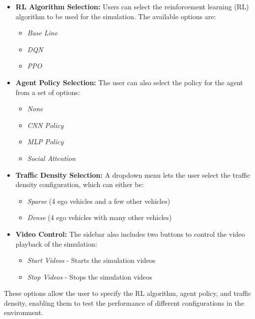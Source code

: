 \begin{itemize}
    \item \textbf{RL Algorithm Selection:} 
    Users can select the reinforcement learning (RL) algorithm to be used for the simulation. The available options are:
    \begin{itemize}
        \item \textit{Base Line}
        \item \textit{DQN}
        \item \textit{PPO}
    \end{itemize}

    \item \textbf{Agent Policy Selection:} 
    The user can also select the policy for the agent from a set of options:
    \begin{itemize}
        \item \textit{None} 
        \item \textit{CNN Policy}
        \item \textit{MLP Policy}
        \item \textit{Social Attention}
    \end{itemize}
    
    \item \textbf{Traffic Density Selection:} 
    A dropdown menu lets the user select the traffic density configuration, which can either be:
    \begin{itemize}
        \item \textit{Sparse} (4 ego vehicles and a few other vehicles)
        \item \textit{Dense} (4 ego vehicles with many other vehicles)
    \end{itemize}

    \item \textbf{Video Control:} 
    The sidebar also includes two buttons to control the video playback of the simulation:
    \begin{itemize}
        \item \textit{Start Videos} - Starts the simulation videos
        \item \textit{Stop Videos} - Stops the simulation videos
    \end{itemize}
\end{itemize}

These options allow the user to specify the RL algorithm, agent policy, and traffic density, enabling them to test the performance of different configurations in the environment.

